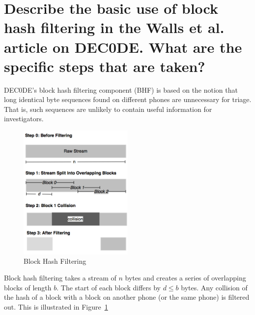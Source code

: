 \documentclass[12pt]{article}
\begin{document}
\section{Describe the basic use of block hash filtering in the Walls et al. article on DEC0DE. What are the specific steps that are taken?}
DEC0DE's block hash filtering component (BHF) is based on the notion that long identical byte sequences
found on different phones are unnecessary for triage. That is, such sequences are unlikely to contain useful information for investigators.\\
\begin{figure}[h]
\centering
\includegraphics[width=0.5\textwidth]{bhf.png}
\caption{Block Hash Filtering}
\label{fig:bhf}
\end{figure}
Block hash filtering takes a stream of $n$ bytes and creates a series of overlapping blocks of length $b$. The start of each block differs by $d \le b$ bytes. Any collision of the hash of a block with a block on another phone (or the same phone) is filtered out. This is illustrated in Figure~\ref{fig:bhf}
\end{document}
